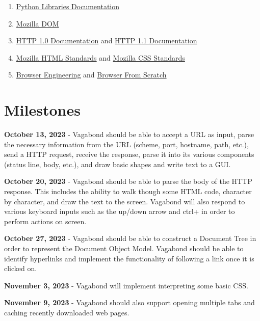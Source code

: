 \documentclass[12pt]{article}
\begin{document}
\begin{enumerate}
\item \href{https://docs.python.org/3/library/index.html}{Python Libraries Documentation}
\item \href{https://developer.mozilla.org/en-US/docs/Web/API/Document_Object_Model/Introduction}{Mozilla DOM}
\item \href{https://datatracker.ietf.org/doc/html/rfc1945}{HTTP 1.0 Documentation} and \href{https://datatracker.ietf.org/doc/html/rfc2616}{HTTP 1.1 Documentation}
\item \href{https://developer.mozilla.org/en-US/docs/Web/HTML}{Mozilla HTML Standards} and \href{https://developer.mozilla.org/en-US/docs/Web/CSS}{Mozilla CSS Standards}
\item \href{http://browser.engineering/index.html}{Browser Engineering} and \href{https://viethung.space/blog/2020/05/29/Browser-from-Scratch-Introduction/}{Browser From Scratch}
\end{enumerate}

\section{Milestones}

\textbf{October 13, 2023} - Vagabond should be able to accept a URL as input, parse the necessary information from the URL (scheme, port, hostname, path, etc.), send a HTTP request, receive the response, parse it into its various components (status line, body, etc.), and draw basic shapes and write text to a GUI.

\textbf{October 20, 2023} - Vagabond should be able to parse the body of the HTTP response.  This includes the ability to walk though some HTML code, character by character, and draw the text to the screen.  Vagabond will also respond to various keyboard inputs such as the up/down arrow and ctrl+ in order to perform actions on screen.

\textbf{October 27, 2023} - Vagabond should be able to construct a Document Tree in order to represent the Document Object Model.  Vagabond should be able to identify hyperlinks and implement the functionality of following a link once it is clicked on.

\textbf{November 3, 2023} - Vagabond will implement interpreting some basic CSS.  

\textbf{November 9, 2023} - Vagabond should also support opening multiple tabs and caching recently downloaded web pages.
\end{document}

